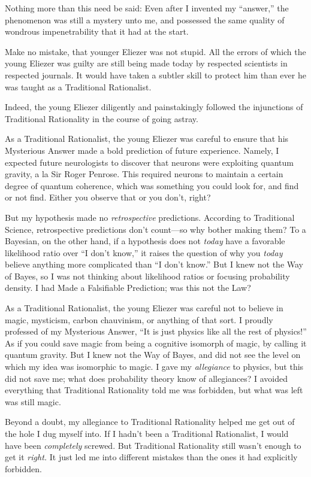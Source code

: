{
 Nothing more than this need be said: Even after I invented my
``answer,'' the phenomenon was still
a mystery unto me, and possessed the same quality of wondrous
impenetrability that it had at the start.}

{
 Make no mistake, that younger Eliezer was not stupid. All the
errors of which the young Eliezer was guilty are still being made today
by respected scientists in respected journals. It would have taken a
subtler skill to protect him than ever he was taught as a Traditional
Rationalist.}

{
 Indeed, the young Eliezer diligently and painstakingly followed
the injunctions of Traditional Rationality in the course of going
astray.}

{
 As a Traditional Rationalist, the young Eliezer was careful to
ensure that his Mysterious Answer made a bold prediction of future
experience. Namely, I expected future neurologists to discover that
neurons were exploiting quantum gravity, a la Sir Roger Penrose. This
required neurons to maintain a certain degree of quantum coherence,
which was something you could look for, and find or not find. Either
you observe that or you don't, right?}

{
 But my hypothesis made no \textit{retrospective} predictions.
According to Traditional Science, retrospective predictions
don't count---so why bother making them? To a Bayesian,
on the other hand, if a hypothesis does not \textit{today} have a
favorable likelihood ratio over ``I
don't know,'' it raises the question
of why you \textit{today} believe anything more complicated than
``I don't know.''
But I knew not the Way of Bayes, so I was not thinking about likelihood
ratios or focusing probability density. I had Made a Falsifiable
Prediction; was this not the Law?}

{
 As a Traditional Rationalist, the young Eliezer was careful not to
believe in magic, mysticism, carbon chauvinism, or anything of that
sort. I proudly professed of my Mysterious Answer,
``It is just physics like all the rest of
physics!'' As if you could save magic from being a
cognitive isomorph of magic, by calling it quantum gravity. But I knew
not the Way of Bayes, and did not see the level on which my idea was
isomorphic to magic. I gave my \textit{allegiance} to physics, but this
did not save me; what does probability theory know of allegiances? I
avoided everything that Traditional Rationality told me was forbidden,
but what was left was still magic.}

{
 Beyond a doubt, my allegiance to Traditional Rationality helped me
get out of the hole I dug myself into. If I hadn't been
a Traditional Rationalist, I would have been \textit{completely}
screwed. But Traditional Rationality still wasn't
enough to get it \textit{right.} It just led me into different mistakes
than the ones it had explicitly forbidden.}


